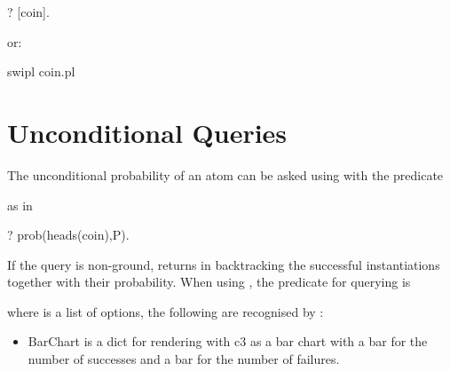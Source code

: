 \documentclass[letterpaper,10pt,english]{sphinxmanual}
\begin{document}
\begin{sphinxVerbatim}[commandchars=\\\{\}]
?\PYGZhy{} [coin].
\end{sphinxVerbatim}

or:

\begin{sphinxVerbatim}[commandchars=\\\{\}]
\PYGZdl{} swipl coin.pl
\end{sphinxVerbatim}


\section{Unconditional Queries}
\label{\detokenize{index:unconditional-queries}}
The unconditional probability of an atom can be asked using  with the predicate

\begin{sphinxVerbatim}[commandchars=\\\{\}]
  
\end{sphinxVerbatim}

as in

\begin{sphinxVerbatim}[commandchars=\\\{\}]
?\PYGZhy{} prob(heads(coin),P).
\end{sphinxVerbatim}

If the query is non-ground,  returns in backtracking the successful instantiations together with their probability.
When using , the predicate for querying is

\begin{sphinxVerbatim}[commandchars=\\\{\}]
  
\end{sphinxVerbatim}

where  is a list of options, the following are recognised by :
\begin{itemize}
\item {} 
 BarChart is a dict for rendering with c3 as a bar chart with a bar for the number of successes and a bar for the number of failures.

\end{itemize}
\end{document}
